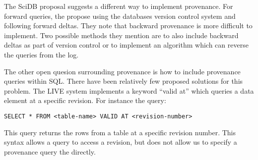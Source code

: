 The SciDB proposal suggests a different way to implement provenance. For forward queries, the propose using the databases version control system and following forward deltas. They note that backward provenance is more difficult to implement. Two possible methods they mention are to also include backward deltas as part of version control or to implement an algorithm which can reverse the queries from the log. 

The other open quesion surrounding provenance is how to include provenance queries within SQL. There have been relatively few proposed solutions for this problem. The LIVE system implements a keyword ``valid at'' which queries a data element at a specific revision. For instance the query:

\begin{verbatim}
SELECT * FROM <table-name> VALID AT <revision-number>
\end{verbatim}

This query returns the rows from a table at a specific revision number. This syntax allows a query to access a revision, but does not allow us to specify a provenance query the directly. 
